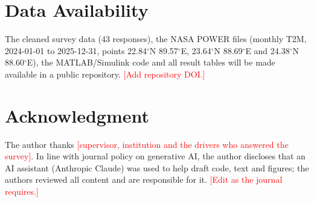 \documentclass[11pt,a4paper]{article}
\newcommand{\todo}[1]{\textcolor{red}{#1}}%
\begin{document}
\maketitle








\section*{Data Availability}
The cleaned survey data (43 responses), the NASA POWER files (monthly T2M, 2024-01-01 to 2025-12-31, points 22.84$^\circ$N 89.57$^\circ$E, 23.64$^\circ$N 88.69$^\circ$E and 24.38$^\circ$N 88.60$^\circ$E), the MATLAB/Simulink code and all result tables will be made available in a public repository. \todo{[Add repository DOI.]}
\section*{Acknowledgment}
The author thanks \todo{[supervisor, institution and the drivers who answered the survey]}. In line with journal policy on generative AI, the author discloses that an AI assistant (Anthropic Claude) was used to help draft code, text and figures; the authors reviewed all content and are responsible for it. \todo{[Edit as the journal requires.]}


\end{document}
